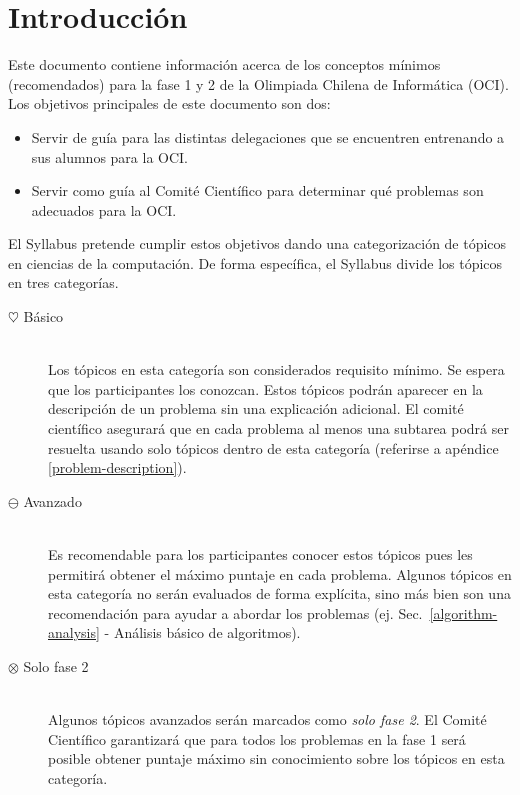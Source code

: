 \documentclass{article}
\newcommand{\basic}{$\heartsuit$}
\newcommand{\advanced}{$\ominus$}
\newcommand{\ultra}{$\otimes$}
\newcommand{\new}{\color{red}}
\begin{document}
\section{Introducción}\label{sec:intro}
Este documento contiene información acerca de los conceptos mínimos (recomendados)
para la {\new fase 1 y 2} de la Olimpiada Chilena de Informática (OCI).
Los objetivos principales de este documento son dos:
\begin{itemize}
  \item Servir de guía para las distintas delegaciones que se encuentren
    entrenando a sus alumnos para la OCI.
  \item Servir como guía al Comité Científico para determinar qué problemas son
    adecuados para la OCI.
\end{itemize}
El Syllabus pretende cumplir estos objetivos dando una categorización de tópicos
en ciencias de la computación.
De forma específica, el Syllabus divide los tópicos en tres categorías.
\begin{description}
\item[\basic{} Básico]
  \hspace{1em} \\
  Los tópicos en esta categoría son considerados requisito mínimo.
    Se espera que los participantes los conozcan.
    Estos tópicos podrán aparecer en la descripción de un problema sin una
    explicación adicional.
    El comité científico asegurará que en cada problema al menos una subtarea podrá
    ser resuelta usando solo tópicos dentro de esta categoría (referirse a
    apéndice \ref{problem-description}).
  \item[\advanced{} Avanzado]
    \hspace{1em} \\
    Es recomendable para los participantes conocer estos tópicos pues les
    permitirá obtener el máximo puntaje en cada problema.
    Algunos tópicos en esta categoría no serán evaluados de forma explícita,
    sino más bien son una recomendación para ayudar a abordar los problemas (ej.
    Sec.~\ref{algorithm-analysis} - Análisis básico de algoritmos).
  \item[\ultra{} {\new Solo fase 2} ]
    \hspace{1em} \\
    Algunos tópicos avanzados serán marcados como \textit{\new solo fase 2}.
    El Comité Científico garantizará que para todos los problemas en la
    {\new fase 1} será posible obtener puntaje máximo sin conocimiento sobre los
    tópicos en esta categoría.
\end{description}
\end{document}
